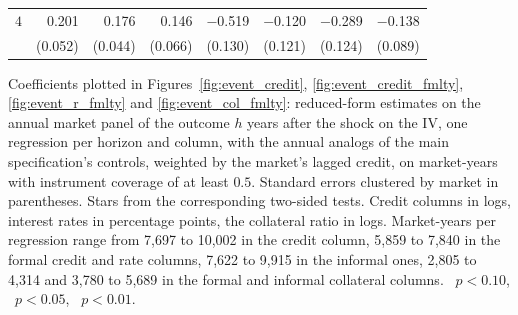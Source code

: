 \begin{threeparttable}
\begin{tabular}{@{}crrrrrrr@{}}
$4$ & 0.201\sym{***} & 0.176\sym{***} & 0.146\sym{**} & $-$0.519\sym{***} & $-$0.120 & $-$0.289\sym{**} & $-$0.138 \\
 & (0.052) & (0.044) & (0.066) & (0.130) & (0.121) & (0.124) & (0.089) \\
\bottomrule
\end{tabular}
\begin{tablenotes}[flushleft]
\footnotesize
\item Coefficients plotted in Figures~\ref{fig:event_credit}, \ref{fig:event_credit_fmlty}, \ref{fig:event_r_fmlty} and \ref{fig:event_col_fmlty}: reduced-form estimates on the annual market panel of the outcome $h$ years after the shock on the IV, one regression per horizon and column, with the annual analogs of the main specification's controls, weighted by the market's lagged credit, on market-years with instrument coverage of at least $0.5$. Standard errors clustered by market in parentheses. Stars from the corresponding two-sided tests. Credit columns in logs, interest rates in percentage points, the collateral ratio in logs. Market-years per regression range from 7,697 to 10,002 in the credit column, 5,859 to 7,840 in the formal credit and rate columns, 7,622 to 9,915 in the informal ones, 2,805 to 4,314 and 3,780 to 5,689 in the formal and informal collateral columns. \sym{*}~$p<0.10$, \sym{**}~$p<0.05$, \sym{***}~$p<0.01$.
\end{tablenotes}
\end{threeparttable}
